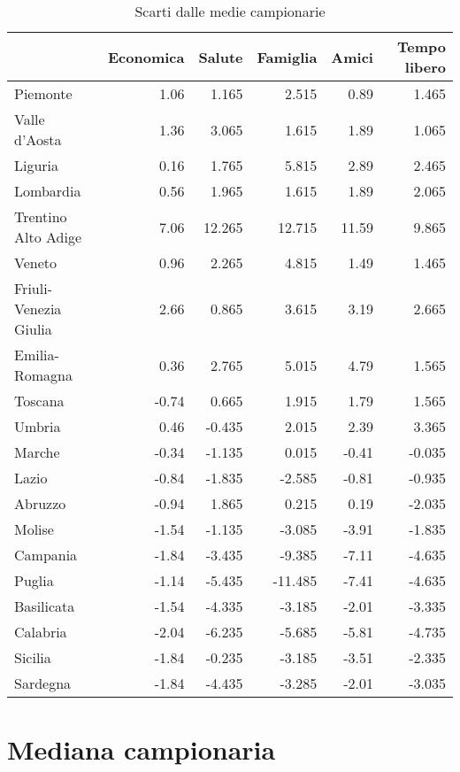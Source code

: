 \documentclass[]{book}
\begin{document}
\begin{table}

\caption{\label{tab:scarto-media-campionaria}Scarti dalle medie campionarie}
\centering
\begin{tabular}[t]{l|r|r|r|r|r}
\hline
  & Economica & Salute & Famiglia & Amici & Tempo libero\\
\hline
Piemonte & 1.06 & 1.165 & 2.515 & 0.89 & 1.465\\
\hline
Valle d'Aosta & 1.36 & 3.065 & 1.615 & 1.89 & 1.065\\
\hline
Liguria & 0.16 & 1.765 & 5.815 & 2.89 & 2.465\\
\hline
Lombardia & 0.56 & 1.965 & 1.615 & 1.89 & 2.065\\
\hline
Trentino Alto Adige & 7.06 & 12.265 & 12.715 & 11.59 & 9.865\\
\hline
Veneto & 0.96 & 2.265 & 4.815 & 1.49 & 1.465\\
\hline
Friuli-Venezia Giulia & 2.66 & 0.865 & 3.615 & 3.19 & 2.665\\
\hline
Emilia-Romagna & 0.36 & 2.765 & 5.015 & 4.79 & 1.565\\
\hline
Toscana & -0.74 & 0.665 & 1.915 & 1.79 & 1.565\\
\hline
Umbria & 0.46 & -0.435 & 2.015 & 2.39 & 3.365\\
\hline
Marche & -0.34 & -1.135 & 0.015 & -0.41 & -0.035\\
\hline
Lazio & -0.84 & -1.835 & -2.585 & -0.81 & -0.935\\
\hline
Abruzzo & -0.94 & 1.865 & 0.215 & 0.19 & -2.035\\
\hline
Molise & -1.54 & -1.135 & -3.085 & -3.91 & -1.835\\
\hline
Campania & -1.84 & -3.435 & -9.385 & -7.11 & -4.635\\
\hline
Puglia & -1.14 & -5.435 & -11.485 & -7.41 & -4.635\\
\hline
Basilicata & -1.54 & -4.335 & -3.185 & -2.01 & -3.335\\
\hline
Calabria & -2.04 & -6.235 & -5.685 & -5.81 & -4.735\\
\hline
Sicilia & -1.84 & -0.235 & -3.185 & -3.51 & -2.335\\
\hline
Sardegna & -1.84 & -4.435 & -3.285 & -2.01 & -3.035\\
\hline
\end{tabular}
\end{table}

\section{Mediana campionaria}\label{mediana-campionaria}
\end{document}
